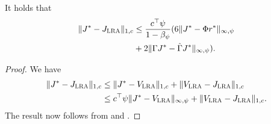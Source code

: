 \begin{theorem}
\label{cmt2mn}
It holds that
\begin{align}\label{finalbndmn}
\begin{split}
\norm{J^*-\hj}_{1,c}
&\leq\frac{c^\top\psi}{1-\beta_\psi}(6 \norm{J^*-\Phi r^*}_{\mn}\\
&+2\norm{\Gamma J^*-\hg J^*}_{\mn}).
\end{split}
\end{align}
\end{theorem}
\begin{proof}
We have
\begin{align}
\|J^*-J_{\text{\sc LRA}}\|_{1,c}\nonumber
&\leq\|J^*-V_{\text{\sc LRA}}\|_{1,c}+\|V_{\text{\sc LRA}}-J_{\text{\sc LRA}}\|_{1,c}\nonumber\\
&\leq c^\top \psi \|J^*-V_{\text{\sc LRA}}\|_{\infty,\psi}+\|V_{\text{\sc LRA}}-J_{\text{\sc LRA}}\|_{1,c}.\nonumber
\end{align}
The result now follows from  and .
\end{proof}

